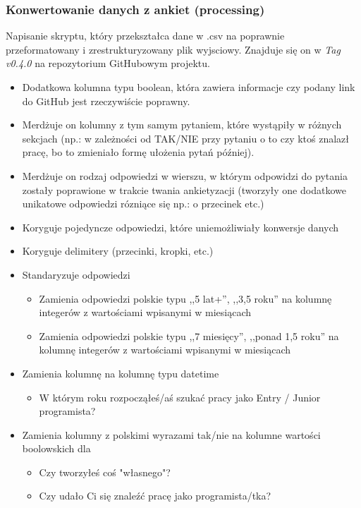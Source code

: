 \documentclass[graybox]{svmult}
\begin{document}
\subsubsection{Konwertowanie danych z ankiet (processing)}

Napisanie skryptu, który przekształca dane w .csv na poprawnie przeformatowany i zrestrukturyzowany plik wyjsciowy. Znajduje się on w \emph{Tag v0.4.0} na repozytorium GitHubowym projektu. 

\begin{itemize}
  \item Dodatkowa kolumna typu boolean, która zawiera informacje czy podany link do GitHub jest rzeczywiście poprawny.
  \item Merdżuje on kolumny z tym samym pytaniem, które wystąpiły w różnych sekcjach (np.: w zależności od TAK/NIE przy pytaniu o to czy ktoś znalazł pracę, bo to zmieniało formę ułożenia pytań później).
  \item Merdżuje on rodzaj odpowiedzi w wierszu, w którym odpowidzi do pytania zostały poprawione w trakcie twania ankietyzacji (tworzyły one dodatkowe unikatowe odpowiedzi rózniące się np.: o przecinek etc.)
  \item Koryguje pojedyncze odpowiedzi, które uniemożliwiały konwersje danych
  \item Koryguje delimitery (przecinki, kropki, etc.)
  \item Standaryzuje odpowiedzi
  \begin{itemize}
    \item Zamienia odpowiedzi polskie typu ,,5 lat+'', ,,3,5 roku'' na kolumnę integerów z wartościami wpisanymi w miesiącach
    \item Zamienia odpowiedzi polskie typu ,,7 miesięcy'', ,,ponad 1,5 roku'' na kolumnę integerów z wartościami wpisanymi w miesiącach
  \end{itemize}
  \item Zamienia kolumnę na kolumnę typu datetime
  \begin{itemize}
    \item W którym roku rozpocząłeś/aś szukać pracy jako Entry / Junior programista?
  \end{itemize}
  \item Zamienia kolumny z polskimi wyrazami tak/nie na kolumne wartości boolowskich dla
  \begin{itemize}
    \item Czy tworzyłeś coś "własnego"?
    \item Czy udało Ci się znaleźć pracę jako programista/tka?

\end{itemize}
\end{itemize}
\end{document}
